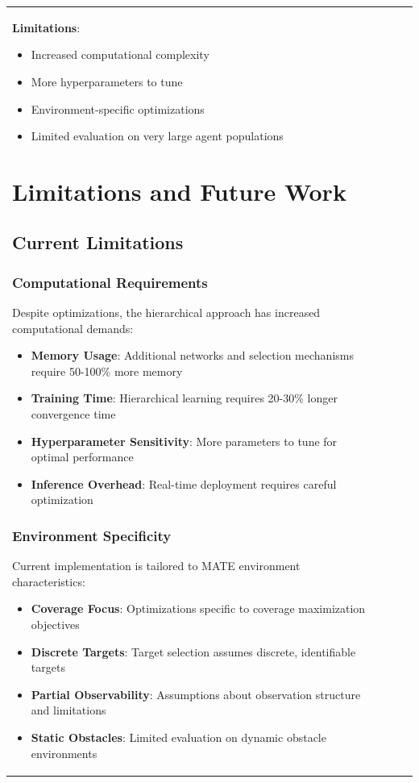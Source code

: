 \documentclass[12pt,a4paper]{report}
\begin{document}
\begin{table}[H]
\begin{table}[H]
\begin{tabular}{lccc}
\begin{table}[H]
\begin{table}[H]
\textbf{Limitations}:
\begin{itemize}
\item Increased computational complexity
\item More hyperparameters to tune
\item Environment-specific optimizations
\item Limited evaluation on very large agent populations
\end{itemize}

\chapter{Limitations and Future Work}

\section{Current Limitations}

\subsection{Computational Requirements}
Despite optimizations, the hierarchical approach has increased computational demands:

\begin{itemize}
\item \textbf{Memory Usage}: Additional networks and selection mechanisms require 50-100\% more memory
\item \textbf{Training Time}: Hierarchical learning requires 20-30\% longer convergence time
\item \textbf{Hyperparameter Sensitivity}: More parameters to tune for optimal performance
\item \textbf{Inference Overhead}: Real-time deployment requires careful optimization
\end{itemize}

\subsection{Environment Specificity}
Current implementation is tailored to MATE environment characteristics:

\begin{itemize}
\item \textbf{Coverage Focus}: Optimizations specific to coverage maximization objectives
\item \textbf{Discrete Targets}: Target selection assumes discrete, identifiable targets
\item \textbf{Partial Observability}: Assumptions about observation structure and limitations
\item \textbf{Static Obstacles}: Limited evaluation on dynamic obstacle environments
\end{itemize}


\end{table}
\end{table}
\end{tabular}
\end{table}
\end{table}
\end{document}
